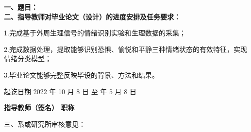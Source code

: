 \cleardoublepage{}

{
    \bfseries
    \noindent 一、题目：\\
    \noindent 二、指导教师对毕业论文（设计）的进度安排及任务要求：\\

    \vskip 3mm
    \mdseries

    1.完成基于外周生理信号的情绪识别实验和生理数据的采集；
    
    2.完成数据处理，提取能够识别恐惧、愉悦和平静三种情绪状态的有效特征，实现情绪分类模型；

    3.毕业论文能够完整反映毕设的背景、方法和结果。

    \bfseries
    \vskip 80mm

    \noindent 起讫日期 2022 年 10  月 8  日 \quad 至   年 5  月  8 日
    \begin{flushright}
        \bfseries {}
            指导教师（签名） \underline{} 职称 \underline{}
    \end{flushright}

    \noindent 三、系或研究所审核意见：\\

    \mbox{} \vfill
    \signature{负责人（签名）}
}
